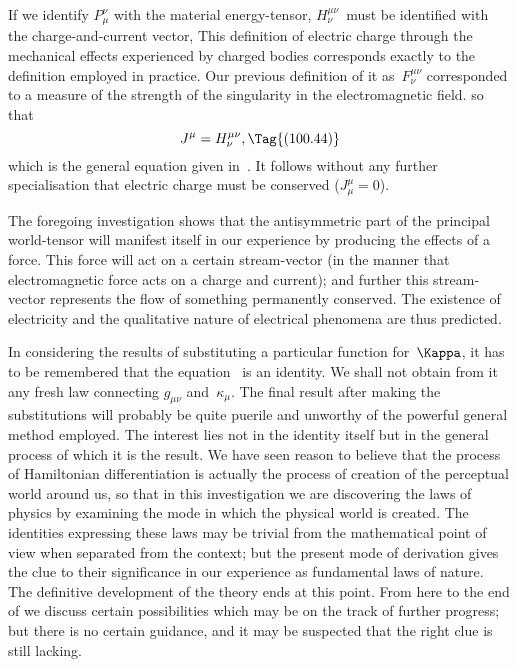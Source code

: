 \documentclass[12pt]{book}
\begin{document}
If we identify $P_{\mu}^{\nu}$ with the material energy\hyp{}tensor, $H_{\nu}^{\mu\nu}$~must be identified
%
%
with the charge\hyp{}and\hyp{}current vector\footnotemark,\footnotetext
  {This definition of electric charge through the mechanical effects experienced by charged
  bodies corresponds exactly to the definition employed in practice. Our previous definition of it
  as~$F_{\nu}^{\mu\nu}$ corresponded to a measure of the strength of the singularity in the electromagnetic field.}
so that
\[
J^{\mu} = H_{\nu}^{\mu\nu},
\Tag{(100.44)}
\]
which is the general equation given in~. It follows without any further
specialisation that electric charge must be conserved ($J_{\mu}^{\mu} = 0$).

The foregoing investigation shows that the antisymmetric part of the
principal world\hyp{}tensor will manifest itself in our experience by producing
the effects of a force. This force will act on a certain stream\hyp{}vector (in
the manner that electromagnetic force acts on a charge and current); and
further this stream\hyp{}vector represents the flow of something permanently conserved.
The existence of electricity and the qualitative nature of electrical
phenomena are thus predicted.

In considering the results of substituting a particular function for~$\Kappa$, it
has to be remembered that the equation~ is an identity. We shall
not obtain from it any fresh law connecting $g_{\mu\nu}$ and~$\kappa_{\mu}$. The final result after
making the substitutions will probably be quite puerile and unworthy of the
powerful general method employed. The interest lies not in the identity
itself but in the general process of which it is the result. We have seen
reason to believe that the process of Hamiltonian differentiation is actually
the process of creation of the perceptual world around us, so that in this
%
investigation we are discovering the laws of physics by examining the mode
in which the physical world is created. The identities expressing these
laws may be trivial from the mathematical point of view when separated
from the context; but the present mode of derivation gives the clue to their
significance in our experience as fundamental laws of nature\footnotemark.\footnotetext
  {The definitive development of the theory ends at this point. From here to the end of 
  we discuss certain possibilities which may be on the track of further progress; but there is no
  certain guidance, and it may be suspected that the right clue is still lacking.}
\end{document}
